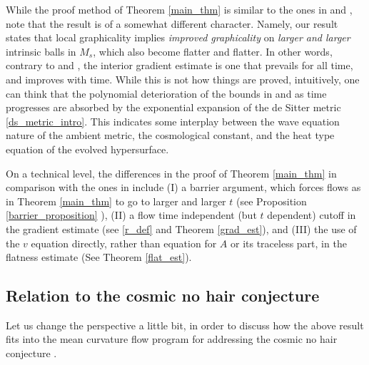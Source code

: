 \documentclass[leqno,11pt]{amsart}
\theoremstyle{definition}
\begin{document}
\bigskip

While the proof method of Theorem \ref{main_thm} is similar to the ones in \cite{EH_interior} and \cite{Ecker_mink}, note that the result is of a somewhat different character. Namely, our result states that local graphicality implies \textit{improved graphicality} on \textit{larger and larger} intrinsic balls in $M_s$, which also become flatter and flatter. In other words, contrary to \cite{EH_interior} and \cite{Ecker_mink}, the interior gradient estimate is one that prevails for all time, and improves with time. While this is not how things are proved, intuitively, one can think that the polynomial deterioration of the bounds in  \cite{EH_interior} and \cite{Ecker_mink} as time progresses are absorbed by the exponential  expansion of the de Sitter metric \eqref{ds_metric_intro}. This indicates some interplay between the wave equation nature of the ambient metric{, the cosmological constant,}  and the heat type equation of the evolved hypersurface.

\bigskip

On a technical level, the differences in the proof of Theorem \ref{main_thm} in comparison with the ones in \cite{EH_interior,Ecker_mink} include (I) a barrier argument, which forces flows as in Theorem \ref{main_thm} to go to larger and larger $t$ (see Proposition \ref{barrier_proposition} ), (II) a flow time independent (but $t$ dependent) cutoff in the gradient estimate (see \eqref{r_def} and Theorem \ref{grad_est}), and (III) the use of the $v$ equation directly, rather than equation for $A$ or its traceless part, in the flatness estimate (See Theorem \ref{flat_est}). 


\subsection*{Relation to the cosmic no hair conjecture}\label{cnh_relate}

Let us change the perspective a little bit, in order to discuss how the above result fits into the mean curvature flow program for addressing the cosmic no hair conjecture \cite{KS, CSV, CHSV}. 
\end{document}
